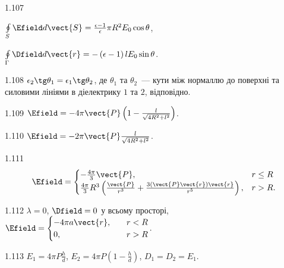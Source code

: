 \begin{Solution}{1.{107}}
	\begin{enumerate*}[label=\alph*)]
		\item $\oint\limits_{S} \Efield d\vect{S} = \frac{\epsilon  -1}{\epsilon} \pi R^2 E_0 \cos\theta$,
		\item $\oint\limits_{\Gamma} \Dfield d\vect{r} = - \left( \epsilon -1\right)  l E_0 \sin\theta$.
	\end{enumerate*}
	
\end{Solution}
\begin{Solution}{1.{108}}
		$\epsilon_2 \tg\theta_1 = \epsilon_1 \tg\theta_2$, де $\theta_1$ та $\theta_2$~--- кути між нормаллю до поверхні та силовими лініями в діелектрику $1$ та $2$, відповідно.
	
\end{Solution}
\begin{Solution}{1.{109}}
	$\Efield = -4\pi \vect{P} \left( 1 - \frac{l}{\sqrt{4R^2 + l^2}}\right)$.
\end{Solution}
\begin{Solution}{1.{110}}
	$\Efield = -2\pi \vect{P} \frac{l}{\sqrt{4R^2 + l^2}}$.
\end{Solution}
\begin{Solution}{1.{111}}
	\[
	\Efield =
	\begin{cases}
	- \frac{4\pi}{3}\vect{P},                                                                                   & r \le R \\
	\frac{4\pi}{3}R^3\left( \frac{\vect{P}}{r^3} + \frac{3\left(\vect{P}\vect{r}\right)\vect{r} }{r^5}\right) , & r > R.
	\end{cases}
	\]
\end{Solution}
\begin{Solution}{1.{112}}
	$\lambda = 0$,
	$\Dfield = 0$ у всьому просторі,
	$\Efield = %
		\begin{cases}
			- 4\pi  a  \vect{r}, & \quad r < R \\
			0,                              & \quad r > R
		\end{cases}
	$.
\end{Solution}
\begin{Solution}{1.{113}}
		$E_1 = 4\pi P\frac{h}{d}$, $E_2  =4\pi P \left( 1 - \frac{h}{d}\right) $, $D_1 = D_2 = E_1$.
	
\end{Solution}
